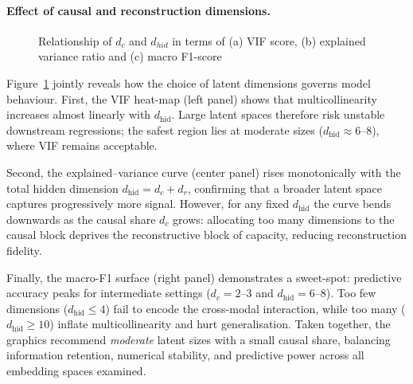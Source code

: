\documentclass[14pt]{extarticle}
\begin{document}
	\paragraph{Effect of causal and reconstruction dimensions.}
	\begin{figure}[bhtp]
		\centering
		\par
		\par
		\caption{Relationship of $d_c$ and $d_{hid}$ in terms of (a) VIF score, (b) explained variance ratio and (c) macro F1-score}
		\label{fig:dc_and_dhid_relationship}
	\end{figure}

	Figure~\ref{fig:dc_and_dhid_relationship}
	jointly reveals how the choice of latent dimensions governs model behaviour.  
	First, the VIF heat-map (left panel) shows that multicollinearity increases almost linearly with $d_{\text{hid}}$.  
	Large latent spaces therefore risk unstable downstream regressions; the safest region lies at moderate sizes ($d_{\text{hid}}\!\approx\!6$–$8$), where VIF remains acceptable.  
	
	Second, the explained–variance curve (center panel) rises monotonically with the total hidden dimension $d_{\text{hid}}=d_c+d_r$, confirming that a broader latent space captures progressively more signal.  
	However, for any fixed $d_{\text{hid}}$ the curve bends downwards as the causal share $d_c$ grows: allocating too many dimensions to the causal block deprives the reconstructive block of capacity, reducing reconstruction fidelity.
	
	Finally, the macro-F1 surface (right panel) demonstrates a sweet-spot: predictive accuracy peaks for intermediate settings ($d_c=2$–$3$ and $d_{\text{hid}}=6$–$8$).  
	Too few dimensions ($d_{\text{hid}}\le 4$) fail to encode the cross-modal interaction, while too many ($d_{\text{hid}}\ge 10$) inflate multicollinearity and hurt generalisation.  
	Taken together, the graphics recommend \emph{moderate} latent sizes with a small causal share, balancing information retention, numerical stability, and predictive power across all embedding spaces examined.
	
\end{document}

